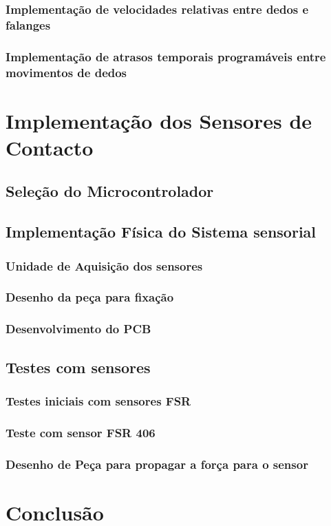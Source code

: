 \subsubsection{Implementação de velocidades relativas entre dedos e falanges}

\subsubsection{Implementação de atrasos temporais programáveis entre movimentos de dedos}




\section{Implementação dos Sensores de Contacto}


\subsection{Seleção do Microcontrolador}







\subsection{Implementação Física do Sistema sensorial}

\subsubsection{Unidade de Aquisição dos sensores}

\subsubsection{Desenho da peça para fixação}

\subsubsection{Desenvolvimento do PCB}


\subsection{Testes com sensores}

\subsubsection{Testes iniciais com sensores FSR}

\subsubsection{Teste com sensor FSR 406}

\subsubsection{Desenho de Peça para propagar a força para o sensor}


\section{Conclusão}
